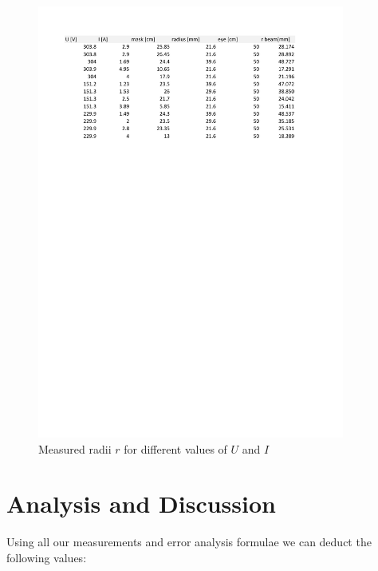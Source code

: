 \documentclass{scrreprt}
\begin{document}
\begin{figure}[H]
	\centering
  \includegraphics[width=0.9\textwidth]{diag/measurements.pdf}
	\caption{Measured radii $r$ for different values of $U$ and $I$}
	\label{fig:measurements}
\end{figure}

\section{Analysis and Discussion}

Using all our measurements and error analysis formulae we can deduct the following values:
\end{document}
